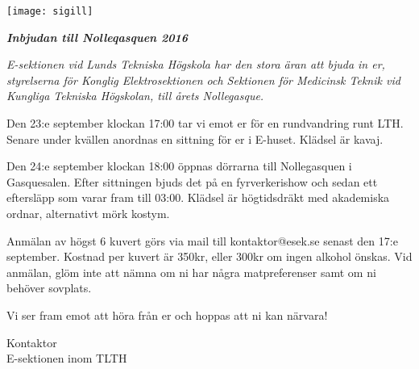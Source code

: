 \documentclass[11pt]{article}
\def\date{2016}
\def\doctitle{Inbjudan till Nolleqasquen \date}
\def\rec{styrelserna för Konglig Elektrosektionen och Sektionen för Medicinsk Teknik vid Kungliga Tekniska Högskolan}
\begin{document}
    \begin{center}
        \texttt{[image: sigill]}
        \par
        \vspace*{7mm}

        \textit{\textbf{\huge \doctitle}}
    \end{center}

    {\it
    E-sektionen vid Lunds Tekniska Högskola har den stora äran att bjuda in er, {\rec}, till årets Nollegasque.

    Den 23:e september klockan 17:00 tar vi emot er för en rundvandring runt LTH. Senare under kvällen anordnas en sittning för er i E-huset. Klädsel är kavaj.

    Den 24:e september klockan 18:00 öppnas dörrarna till Nollegasquen i Gasquesalen. Efter sittningen bjuds det på en fyrverkerishow och sedan ett eftersläpp som varar fram till 03:00. Klädsel är högtidsdräkt med akademiska ordnar, alternativt mörk kostym.

    Anmälan av högst 6 kuvert görs via mail till kontaktor@esek.se senast den 17:e september. Kostnad per kuvert är 350kr, eller 300kr om ingen alkohol önskas. Vid anmälan, glöm inte att nämna om ni har några matpreferenser samt om ni behöver sovplats.

    Vi ser fram emot att höra från er och hoppas att ni kan närvara!
    }

    \begin{signatures}{1}
    \signature{Erik Månsson}{Kontaktor\\E-sektionen inom TLTH}
    \end{signatures}
\end{document}
